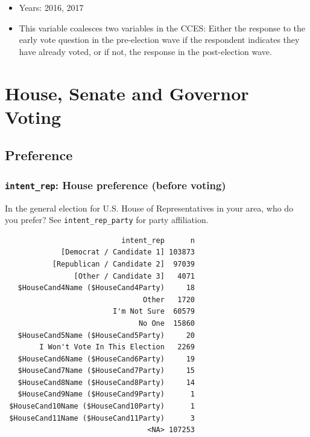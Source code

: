 \documentclass[10pt,article,oneside]{memoir}
\theoremstyle{definition}
\begin{document}
\begin{itemize}
\tightlist
\item
  Years: 2016, 2017
\item
  This variable coalesces two variables in the CCES: Either the response
  to the early vote question in the pre-election wave if the respondent
  indicates they have already voted, or if not, the response in the
  post-election wave.
\end{itemize}

\hypertarget{house-senate-and-governor-voting}{%
\section{House, Senate and Governor
Voting}\label{house-senate-and-governor-voting}}

\hypertarget{preference}{%
\subsection{Preference}\label{preference}}

\hypertarget{intent_rep-house-preference-before-voting}{%
\subsubsection{\texorpdfstring{\texttt{intent\_rep}: House preference
(before
voting)}{intent\_rep: House preference (before voting)}}\label{intent_rep-house-preference-before-voting}}

In the general election for U.S. House of Representatives in your area,
who do you prefer? See \texttt{intent\_rep\_party} for party
affiliation.

\begin{verbatim}
                           intent_rep      n
             [Democrat / Candidate 1] 103873
           [Republican / Candidate 2]  97039
                [Other / Candidate 3]   4071
   $HouseCand4Name ($HouseCand4Party)     18
                                Other   1720
                         I'm Not Sure  60579
                               No One  15860
   $HouseCand5Name ($HouseCand5Party)     20
        I Won't Vote In This Election   2269
   $HouseCand6Name ($HouseCand6Party)     19
   $HouseCand7Name ($HouseCand7Party)     15
   $HouseCand8Name ($HouseCand8Party)     14
   $HouseCand9Name ($HouseCand9Party)      1
 $HouseCand10Name ($HouseCand10Party)      1
 $HouseCand11Name ($HouseCand11Party)      3
                                 <NA> 107253
\end{verbatim}
\end{document}
